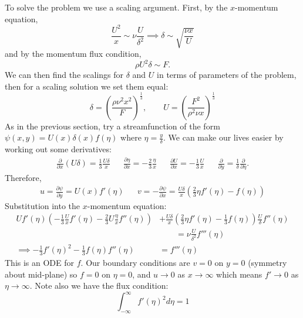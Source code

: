 \documentclass[../Main.tex]{subfiles}
\begin{document}
To solve the problem we use a scaling argument. First, by the $x$-momentum equation,
\begin{equation*}
    \frac{U^2}{x} \sim \nu \frac{U}{\delta^2} \implies \delta \sim \sqrt{\frac{\nu x}{U}}
\end{equation*}
and by the momentum flux condition,
\begin{equation*}
    \rho U^2 \delta \sim F.
\end{equation*}
We can then find the scalings for $\delta$ and $U$ in terms of parameters of the problem, then for a scaling solution we set them equal:
\begin{equation*}
    \delta = \left(\frac{\rho \nu^2 x^2}{F}\right)^{\frac13},\qquad U = \left(\frac{F^2}{\rho^2 \nu x}\right)^{\frac13}
\end{equation*}
As in the previous section, try a streamfunction of the form $\psi(x, y) = U(x) \delta(x) f(\eta)$ where $\eta = \frac y \delta$. We can make our lives easier by working out some derivatives:
\begin{align*}
    \frac{\partial }{\partial x} (U\delta) = \frac13 \frac{U\delta}{x} && \frac{\partial \eta}{\partial x} = -\frac23 \frac \eta x && \frac{\partial U}{\partial x} = -\frac13 \frac U x && \frac{\partial }{\partial y} = \frac1\delta \frac{\partial }{\partial \eta}.
\end{align*}
Therefore,
\begin{align*}
    u = \frac{\partial \psi}{\partial y} = U(x) f'(\eta) && v = -\frac{\partial \psi}{\partial x} = \frac{U\delta}{x} \left(\frac23 \eta f'(\eta) - f(\eta)\right)
\end{align*}
Substitution into the $x$-momentum equation:
\begin{align*}
    Uf'(\eta) \left(-\frac13 \frac U x f'(\eta) - \frac23 U \frac \eta x f''(\eta)\right) &+ \frac{U\delta}{x} \left(\frac23 \eta f'(\eta) - \frac13 f(\eta)\right) \frac U\delta f''(\eta) \\
    &\qquad= \nu \frac{U}{\delta^2} f'''(\eta) \\
    \implies -\frac13 f'(\eta)^2 - \frac13 f(\eta) f''(\eta) &= f'''(\eta)
\end{align*}
This is an ODE for $f$. Our boundary conditions are $v = 0$ on $y = 0$ (symmetry about mid-plane) so $f = 0$ on $\eta = 0$, and $u \to 0$ as $x \to \infty$ which means $f' \to 0$ as $\eta \to \infty$. Note also we have the flux condition:
\begin{equation*}
    \int_{-\infty}^{\infty} f'(\eta)^2 d\eta = 1
\end{equation*}
\end{document}
